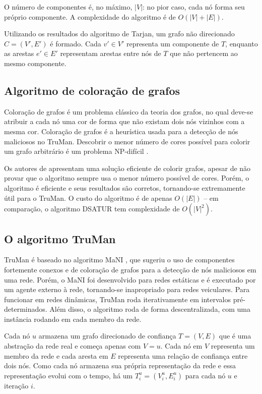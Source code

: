 \begin{resumoextendido}
	O número de componentes é, no máximo, $|V|$: no pior caso, cada nó forma seu próprio componente.
	A complexidade do algoritmo é de $O(|V|+|E|)$.
	
	Utilizando os resultados do algoritmo de Tarjan, um grafo não direcionado $C = (V', E')$ é formado.
	Cada $v' \in V'$ representa um componente de $T$, enquanto as arestas $e' \in E'$ representam arestas entre nós de $T$ que não pertencem ao mesmo componente.
	
	\subsection*{Algoritmo de coloração de grafos}
	Coloração de grafos é um problema clássico da teoria dos grafos, no qual deve-se atribuir a cada nó uma cor de forma que não existam dois nós vizinhos com a mesma cor.
	Coloração de grafos é a heurística usada para a detecção de nós maliciosos no TruMan.
	Descobrir o menor número de cores possível para colorir um grafo arbitrário é um problema NP-difícil \citep{sanchez1989determining}.
	
	Os autores de \citep{mittal2011graph} apresentam uma solução eficiente de colorir grafos, apesar de não provar que o algoritmo sempre usa o menor número possível de cores.
	Porém, o algoritmo é eficiente e seus resultados são corretos, tornando-se extremamente útil para o TruMan.
	O custo do algoritmo é de apenas $O(|E|)$ -- em comparação, o algoritmo DSATUR tem complexidade de $O(|V|^2)$.
	
	\subsection*{O algoritmo TruMan}
	
	TruMan é baseado no algoritmo MaNI \citep{vernize2013dissertation}, que sugeriu o uso de componentes fortemente conexos e de coloração de grafos para a detecção de nós maliciosos em uma rede.
	Porém, o MaNI foi desenvolvido para redes estáticas e é executado por um agente externo à rede, tornando-se inapropriado para redes veiculares.
	Para funcionar em redes dinâmicas, TruMan roda iterativamente em intervalos pré-determinados.
	Além disso, o algoritmo roda de forma descentralizada, com uma instância rodando em cada membro da rede.
	
	Cada nó $u$ armazena um grafo direcionado de confiança $T = (V,E)$ que é uma abstração da rede real e começa apenas com $V = {u}$.
	Cada nó em $V$ representa um membro da rede e cada aresta em $E$ representa uma relação de confiança entre dois nós.
	Como cada nó armazena sua própria representação da rede e essa representação evolui com o tempo, há um $T_i^u = (V_i^u, E_i^u)$ para cada nó $u$ e iteração $i$.
	

\end{resumoextendido}
